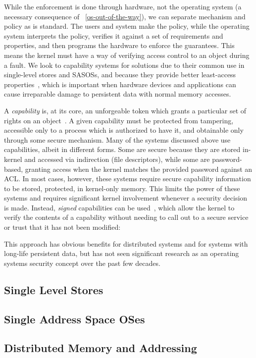 {    While the enforcement is done through hardware, not the operating system (a necessary consequence of
    \observation~\ref{os-out-of-the-way}), we can separate mechanism and policy as is standard. The users
    and system make the policy, while the operating system interprets the policy, verifies it against a
    set of requirements and properties, and then programs the hardware to enforce the guarantees. This
    means the kernel must have a way of verifying access control to an object during a fault. We look to
    capability systems for solutions due to their common use in single-level stores and SASOSs, and
    because they provide better least-access properties~\cite{capmyth}, which is important when hardware devices and
    applications can cause irreparable damage to persistent data with normal memory accesses.

    A \textit{capability} is, at its core, an unforgeable token which
    grants a particular set of rights on an object~\cite{Lampson1973,Landwehr1981,Gong:sigops89}. A
    given capability must be protected from tampering, accessible only to a process which is authorized
    to have it, and obtainable only through some secure mechanism. Many of the systems discussed above
    use capabilities, albeit in different forms. Some are secure because they are stored in-kernel and
    accessed via indirection (\unix file descriptors), while some are password-based, granting access
    when the kernel matches the provided password against an ACL. In most cases, however, these systems
    require secure capability information to be stored, protected, in kernel-only memory. This limits
    the power of these systems and requires significant kernel involvement whenever a security decision
    is made.  Instead, \emph{signed} capabilities can be used~\cite{tanenbaum:osr81}, which allow the
    kernel to verify the contents of a capability without needing to call out to a secure service or
    trust that it has not been modified:



    This approach has obvious benefits for distributed systems and for systems with long-life persistent
    data, but has not seen significant research as an operating systems security concept over the past
    few decades.



}

\subsection{Single Level Stores}

\subsection{Single Address Space OSes}

\subsection{Distributed Memory and Addressing}
